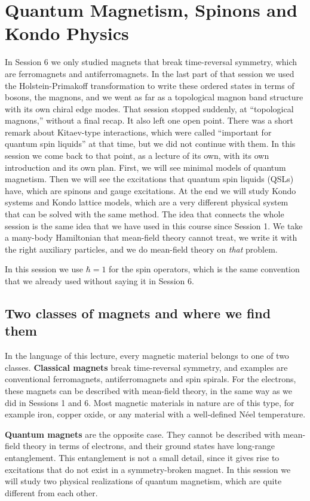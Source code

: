 \chapter{Quantum Magnetism, Spinons and Kondo Physics}

In Session 6 we only studied magnets that break time-reversal symmetry, which are ferromagnets and
antiferromagnets. In the last part of that session we used the Holstein-Primakoff transformation to
write these ordered states in terms of bosons, the magnons, and we went as far as a topological
magnon band structure with its own chiral edge modes. That session stopped suddenly, at
``topological magnons,'' without a final recap. It also left one open point. There was a short
remark about Kitaev-type interactions, which were called ``important for quantum spin liquids'' at
that time, but we did not continue with them. In this session we come back to that point, as a lecture
of its own, with its own introduction and its own plan. First, we will see minimal models of quantum magnetism. Then we will see the excitations that
quantum spin liquids (QSLs) have, which are spinons and gauge excitations. At the end we will study
Kondo systems and Kondo lattice models, which are a very different physical system that can be
solved with the same method. The idea that connects the whole session is the same idea that we
have used in this course since Session 1. We take a many-body Hamiltonian that mean-field theory
cannot treat, we write it with the right auxiliary particles, and we do mean-field theory on
\emph{that} problem.

In this session we use $\hbar = 1$ for the spin operators, which is the same convention that we
already used without saying it in Session 6.

\section{Two classes of magnets and where we find them}

In the language of this lecture, every magnetic material belongs to one of two classes.
\textbf{Classical magnets} break time-reversal symmetry, and examples are conventional
ferromagnets, antiferromagnets and spin spirals. For the electrons, these magnets can be described
with mean-field theory, in the same way as we did in Sessions 1 and 6. Most magnetic materials in
nature are of this type, for example iron, copper oxide, or any material with a well-defined
N\'eel temperature.

\textbf{Quantum magnets} are the opposite case. They cannot be described with mean-field theory in
terms of electrons, and their ground states have long-range entanglement. This entanglement is not
a small detail, since it gives rise to excitations that do not exist in a symmetry-broken magnet.
In this session we will study two physical realizations of quantum magnetism, which are quite
different from each other.

